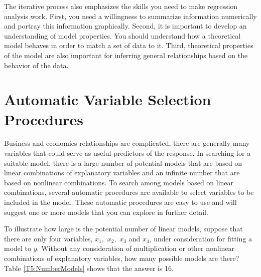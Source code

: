 The iterative process also emphasizes the skills you need to make
regression analysis work. First, you need a willingness to summarize
information numerically and portray this information graphically.
Second, it is important to develop an understanding of model
properties. You should understand how a theoretical model behaves in
order to match a set of data to it. Third, theoretical properties of
the model are also important for inferring general relationships
based on the behavior of the data.


\section{Automatic Variable Selection
Procedures}\label{S5:Automatic}

Business and economics relationships are complicated, there are
generally many variables that could serve as useful predictors of
the response. In searching for a suitable model, there is a large
number of potential models that are based on linear combinations of
explanatory variables and an infinite number that are based on
nonlinear combinations. To search among models based on linear
combinations, several automatic procedures are available to select
variables to be included in the model. These automatic procedures
are easy to use and will suggest one or more models that you can
explore in further detail.

To illustrate how large is the potential number of linear models,
suppose that there are only four variables, $x_{1},$ $x_{2},$
$x_{3}$ and $x_{4}$, under consideration for fitting a model to $y$.
Without any consideration of multiplication or other nonlinear
combinations of explanatory variables, how many possible models are
there? Table \ref{T5:NumberModels} shows that the answer is 16.

